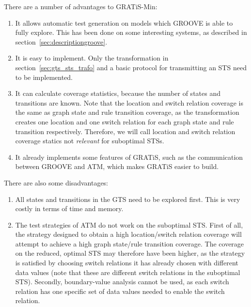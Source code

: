 There are a number of advantages to GRATiS-Min:
\begin{enumerate}
  \item It allows automatic test generation on models which GROOVE is able to fully explore. This has been done on some interesting systems, as described in section~\ref{sec:descriptiongroove}.
  \item It is easy to implement. Only the transformation in section~\ref{sec:gts_sts_trafo} and a basic protocol for transmitting an STS need to be implemented.
  \item It can calculate coverage statistics, because the number of states and transitions are known. Note that the location and switch relation coverage is the same as graph state and rule transition coverage, as the transformation creates one location and one switch relation for each graph state and rule transition respectively. Therefore, we will call location and switch relation coverage statics not \textit{relevant} for suboptimal STSs.
  \item It already implements some features of GRATiS, such as the communication between GROOVE and ATM, which makes GRATiS easier to build.
\end{enumerate}
There are also some disadvantages:
\begin{enumerate}
  \item All states and transitions in the GTS need to be explored first. This is very costly in terms of time and memory.
  \item The test strategies of ATM do not work on the suboptimal STS. First of all, the strategy designed to obtain a high location/switch relation coverage will attempt to achieve a high graph state/rule transition coverage. The coverage on the reduced, optimal STS may therefore have been higher, as the strategy is satisfied by choosing switch relations it has already chosen with different data values (note that these are different switch relations in the suboptimal STS). Secondly, boundary-value analysis cannot be used, as each switch relation has one specific set of data values needed to enable the switch relation.
\end{enumerate}

